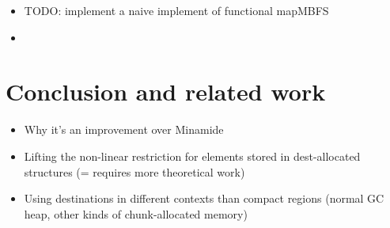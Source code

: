 \documentclass[english]{jflart}
\begin{document}
\begin{itemize}
\item TODO: implement a naive implement of functional mapMBFS
\item \end{itemize}

\section{Conclusion and related work}
\begin{itemize}
\item Why it's an improvement over Minamide

\item Lifting the non-linear restriction for elements stored in dest-allocated structures (= requires more theoretical work)

\item Using destinations in different contexts than compact regions (normal GC heap, other kinds of chunk-allocated memory)
\end{itemize}

\printbibliography
\end{document}
